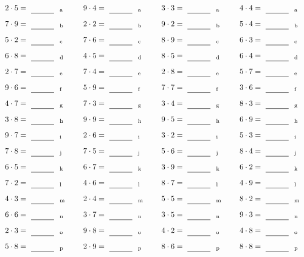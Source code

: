 \documentclass
[
  draft    = true,
  fontsize = 11pt,
  parskip  = half-
]
{scrartcl}
\begin{document}
\par\vfill\par
\begin{align*}
    \pline{2\cdot5}&=\rline{a}
  & \pline{9\cdot4}&=\rline{a}
  & \pline{3\cdot3}&=\rline{a}
  & \pline{4\cdot4}&=\rline{a} \\[1ex]
    \pline{7\cdot9}&=\rline{b}
  & \pline{2\cdot2}&=\rline{b}
  & \pline{9\cdot2}&=\rline{b}
  & \pline{5\cdot4}&=\rline{b} \\[1ex]
    \pline{5\cdot2}&=\rline{c}
  & \pline{7\cdot6}&=\rline{c}
  & \pline{8\cdot9}&=\rline{c}
  & \pline{6\cdot3}&=\rline{c} \\[1ex]
    \pline{6\cdot8}&=\rline{d}
  & \pline{4\cdot5}&=\rline{d}
  & \pline{8\cdot5}&=\rline{d}
  & \pline{6\cdot4}&=\rline{d} \\[1ex]
    \pline{2\cdot7}&=\rline{e}
  & \pline{7\cdot4}&=\rline{e}
  & \pline{2\cdot8}&=\rline{e}
  & \pline{5\cdot7}&=\rline{e} \\[1ex]
    \pline{9\cdot6}&=\rline{f}
  & \pline{5\cdot9}&=\rline{f}
  & \pline{7\cdot7}&=\rline{f}
  & \pline{3\cdot6}&=\rline{f} \\[1ex]
    \pline{4\cdot7}&=\rline{g}
  & \pline{7\cdot3}&=\rline{g}
  & \pline{3\cdot4}&=\rline{g}
  & \pline{8\cdot3}&=\rline{g} \\[1ex]
    \pline{3\cdot8}&=\rline{h}
  & \pline{9\cdot9}&=\rline{h}
  & \pline{9\cdot5}&=\rline{h}
  & \pline{6\cdot9}&=\rline{h} \\[1ex]
    \pline{9\cdot7}&=\rline{i}
  & \pline{2\cdot6}&=\rline{i}
  & \pline{3\cdot2}&=\rline{i}
  & \pline{5\cdot3}&=\rline{i} \\[1ex]
    \pline{7\cdot8}&=\rline{j}
  & \pline{7\cdot5}&=\rline{j}
  & \pline{5\cdot6}&=\rline{j}
  & \pline{8\cdot4}&=\rline{j} \\[1ex]
    \pline{6\cdot5}&=\rline{k}
  & \pline{6\cdot7}&=\rline{k}
  & \pline{3\cdot9}&=\rline{k}
  & \pline{6\cdot2}&=\rline{k} \\[1ex]
    \pline{7\cdot2}&=\rline{l}
  & \pline{4\cdot6}&=\rline{l}
  & \pline{8\cdot7}&=\rline{l}
  & \pline{4\cdot9}&=\rline{l} \\[1ex]
    \pline{4\cdot3}&=\rline{m}
  & \pline{2\cdot4}&=\rline{m}
  & \pline{5\cdot5}&=\rline{m}
  & \pline{8\cdot2}&=\rline{m} \\[1ex]
    \pline{6\cdot6}&=\rline{n}
  & \pline{3\cdot7}&=\rline{n}
  & \pline{3\cdot5}&=\rline{n}
  & \pline{9\cdot3}&=\rline{n} \\[1ex]
    \pline{2\cdot3}&=\rline{o}
  & \pline{9\cdot8}&=\rline{o}
  & \pline{4\cdot2}&=\rline{o}
  & \pline{4\cdot8}&=\rline{o} \\[1ex]
    \pline{5\cdot8}&=\rline{p}
  & \pline{2\cdot9}&=\rline{p}
  & \pline{8\cdot6}&=\rline{p}
  & \pline{8\cdot8}&=\rline{p}
\end{align*}
\end{document}
